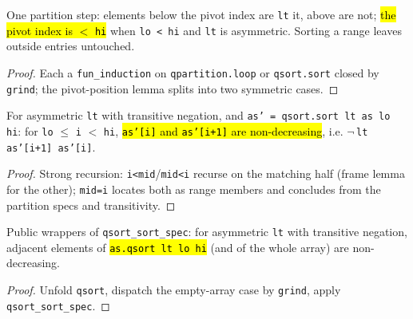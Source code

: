\begin{lemma}
\label{fam:qsort-partition-spec}
\leanok
{}

 One partition step: elements below the pivot index are \texttt{lt} it, above are
not; \hl{the pivot index is $<$ \texttt{hi}} when \texttt{lo < hi} and \texttt{lt} is asymmetric.
Sorting a range leaves outside entries untouched.
\end{lemma}
\begin{proof}
\leanok
{} Each a \texttt{fun\_induction} on \texttt{qpartition.loop} or \texttt{qsort.sort} closed by
\texttt{grind}; the pivot-position lemma splits into two symmetric cases.
\end{proof}

\begin{theorem}
\label{thm:qsort-sort-spec}
\leanok
{}

 For asymmetric \texttt{lt} with transitive negation, and \texttt{as' = qsort.sort lt as
lo hi}: for \texttt{lo} $\le$ \texttt{i} $<$ \texttt{hi}, \hl{\texttt{as'[i]} and \texttt{as'[i+1]} are
non-decreasing}, i.e. $\lnot\,$\texttt{lt as'[i+1] as'[i]}.
\end{theorem}
\begin{proof}
\leanok
{} Strong recursion: \texttt{i<mid}/\texttt{mid<i} recurse on the matching half (frame
lemma for the other); \texttt{mid=i} locates both as range members and concludes from the partition
specs and transitivity.
\end{proof}

\begin{lemma}
\label{thm:qsort-sorted-adjacent}
\leanok
{}

 Public wrappers of \texttt{qsort\_sort\_spec}: for asymmetric \texttt{lt} with
transitive negation, adjacent elements of \hl{\texttt{as.qsort lt lo hi}} (and of the whole array) are
non-decreasing.
\end{lemma}
\begin{proof}
\leanok
{} Unfold \texttt{qsort}, dispatch the empty-array case by \texttt{grind}, apply
\texttt{qsort\_sort\_spec}.
\end{proof}

